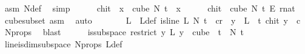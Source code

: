 \begin{isabellebody}
\ asm\ N{\isacharunderscore}{\kern0pt}def\ \isamarkupfalse%
\ simp\isanewline
\ \ \ \ \isamarkupfalse%
\ {\isacharquery}{\kern0pt}chi{\isacharunderscore}{\kern0pt}t\ {\isacharequal}{\kern0pt}\ {\isachardoublequoteopen}{\isasymlambda}x\ {\isasymin}\ cube\ N{\isacharprime}{\kern0pt}\ t{\isachardot}{\kern0pt}\ {\isasymchi}\ x{\isachardoublequoteclose}\isanewline
\ \ \ \ \isamarkupfalse%
\ {\isachardoublequoteopen}{\isacharquery}{\kern0pt}chi{\isacharunderscore}{\kern0pt}t\ {\isasymin}\ cube\ N{\isacharprime}{\kern0pt}\ t\ {\isasymrightarrow}\isactrlsub E\ {\isacharbraceleft}{\kern0pt}{\isachardot}{\kern0pt}{\isachardot}{\kern0pt}{\isacharless}{\kern0pt}r{\isacharcolon}{\kern0pt}{\isacharcolon}{\kern0pt}nat{\isacharbraceright}{\kern0pt}{\isachardoublequoteclose}\ \isamarkupfalse%
\ cube{\isacharunderscore}{\kern0pt}subset\ asm\ \isamarkupfalse%
\ auto\isanewline
\ \ \ \ \isamarkupfalse%
\ \isamarkupfalse%
\ L\ \ L{\isacharunderscore}{\kern0pt}def{\isacharcolon}{\kern0pt}\ {\isachardoublequoteopen}is{\isacharunderscore}{\kern0pt}line\ L\ N{\isacharprime}{\kern0pt}\ t\ {\isasymand}\ {\isacharparenleft}{\kern0pt}{\isasymexists}c{\isacharless}{\kern0pt}r{\isachardot}{\kern0pt}\ \ {\isacharparenleft}{\kern0pt}{\isasymforall}y\ {\isasymin}\ L\ {\isacharbackquote}{\kern0pt}\ {\isacharbraceleft}{\kern0pt}{\isachardot}{\kern0pt}{\isachardot}{\kern0pt}{\isacharless}{\kern0pt}t{\isacharbraceright}{\kern0pt}{\isachardot}{\kern0pt}\ {\isacharquery}{\kern0pt}chi{\isacharunderscore}{\kern0pt}t\ y\ {\isacharequal}{\kern0pt}\ c{\isacharparenright}{\kern0pt}{\isacharparenright}{\kern0pt}{\isachardoublequoteclose}\ \isamarkupfalse%
\ N{\isacharprime}{\kern0pt}{\isacharunderscore}{\kern0pt}props\ \isamarkupfalse%
\ blast\isanewline
\isanewline
\ \ \ \ \isamarkupfalse%
\ {\isachardoublequoteopen}is{\isacharunderscore}{\kern0pt}subspace\ {\isacharparenleft}{\kern0pt}restrict\ {\isacharparenleft}{\kern0pt}{\isasymlambda}y{\isachardot}{\kern0pt}\ L\ {\isacharparenleft}{\kern0pt}y\ {}{\isacharparenright}{\kern0pt}{\isacharparenright}{\kern0pt}\ {\isacharparenleft}{\kern0pt}cube\ {}\ t{\isacharparenright}{\kern0pt}{\isacharparenright}{\kern0pt}\ {}\ N{\isacharprime}{\kern0pt}\ t{\isachardoublequoteclose}\ \isamarkupfalse%
\ line{\isacharunderscore}{\kern0pt}is{\isacharunderscore}{\kern0pt}dim{}{\isacharunderscore}{\kern0pt}subspace\ N{\isacharprime}{\kern0pt}{\isacharunderscore}{\kern0pt}props\ L{\isacharunderscore}{\kern0pt}def\ \isanewline

\end{isabellebody}
